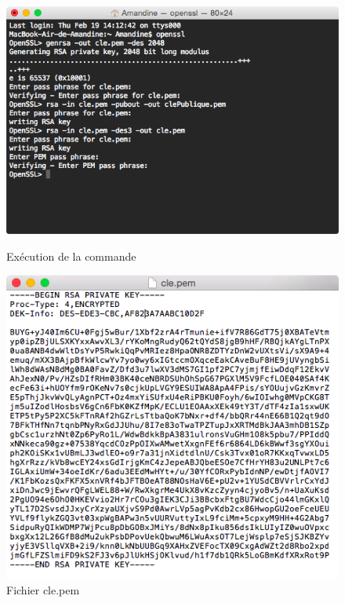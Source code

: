 \documentclass[11pt]{article}
\begin{document}
\begin{figure}[hbtp]
    \begin{minipage}[b]{0.4\linewidth}
        \centering \includegraphics[scale=0.4]{Capture/question3.png}
        \caption{Exécution de la commande}
                \label{fig:cde2}
\label{fig:base}
    \end{minipage}\hfill
    \begin{minipage}[b]{0.48\linewidth}
        \centering \includegraphics[scale=0.4]{Capture/question3b.png}
        \caption{Fichier cle.pem}
         \label{fig:clep}
    \end{minipage}
\end{figure}
\end{document}
